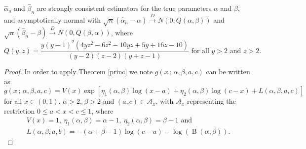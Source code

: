 \documentclass[lineno]{biometrika}
\newcommand{\on}{\operatorname}
\begin{document}
\begin{proposition} $\hat\alpha_n$ and $\hat\beta_n$ are strongly consistent estimators for the true parameters $\alpha$ and $\beta$, and asymptotically normal with $\sqrt{n}\left(\hat{\alpha}_n-\alpha\right)\overset{D}{\to} N\left(0,Q(\alpha,\beta)\right)$ and $\sqrt{n}\left(\hat{\beta}_n-\beta\right)\overset{D}{\to} N\left(0,Q(\beta,\alpha)\right)$, where
\begin{equation*}Q(y,z) = \frac{y(y - 1)^2(4yz^2 - 6z^2 - 10yz + 5y + 16z  - 10)}{(y - 2)(z - 2)(y + z - 1)}\mbox{ for all }y>2\mbox{ and }z>2.
\end{equation*}

\end{proposition}
\begin{proof} In order to apply Theorem \ref{princ}
we note $g(x\,;\,\alpha,\beta,a,c)$ can be written as \begin{equation*} g(x\,;\,\alpha,\beta,a,c)=V(x)\exp\left[\eta_1(\alpha,\beta)\log(x-a)+\eta_2(\alpha,\beta)\log(c-x)+L(\alpha,\beta,a,c)\right]
\end{equation*}
for all $x\in(0,1)$, $\alpha>2$, $\beta>2$ and $(a,c)\in\mathcal{A}_x$, with $\mathcal{A}_x$ representing the restriction $0\leq a<x<c\leq 1$, where
\begin{equation*}
\begin{aligned}V(x)=1,\ \eta_1(\alpha,\beta)=\alpha-1,\ \eta_2(\alpha,\beta)=\beta-1\mbox{ and }\\
L(\alpha,\beta,a,b)=-(\alpha+\beta-1)\log(c-a)-\log(\on{B}(\alpha,\beta)).
\end{aligned} 
\end{equation*}


\end{proof}
\end{document}

